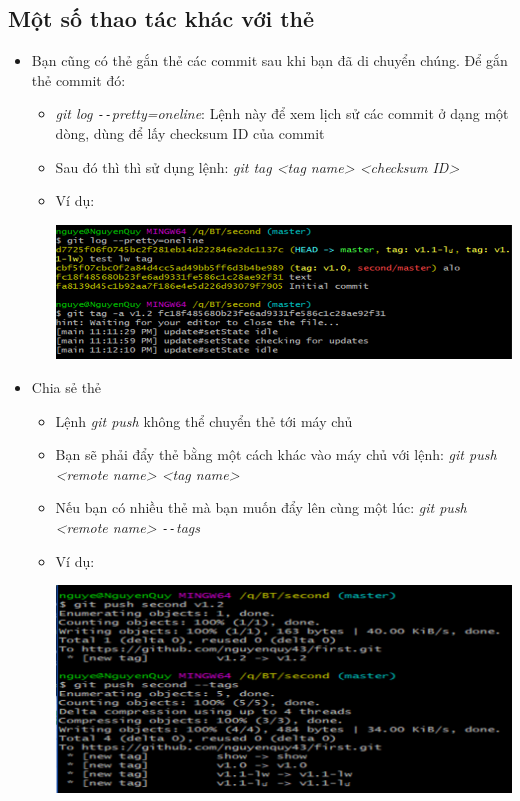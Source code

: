 \documentclass[12pt,a4paper]{report}
\begin{document}
\subsection{Một số thao tác khác với thẻ}
\begin{itemize}
\item Bạn cũng có thẻ gắn thẻ các commit sau khi bạn đã di chuyển chúng. Để gắn thẻ commit đó:
\begin{itemize}
\item {\it git log \texttt{-{}-}pretty=oneline}: Lệnh này để xem lịch sử các commit ở dạng một dòng, dùng để lấy checksum ID của commit
\item Sau đó thì thì sử dụng lệnh: {\it git tag <tag name> <checksum ID>}
\item Ví dụ: 

	\includegraphics[width=0.8\linewidth]{screenshot044}

	\label{fig:screenshot044}
\end{itemize}
\item Chia sẻ thẻ
\begin{itemize}
\item Lệnh \textit{git push} không thể chuyển thẻ tới máy chủ
\item Bạn sẽ phải đẩy thẻ bằng một cách khác vào máy chủ với lệnh: {\it git push <remote name> <tag name>}
\item Nếu bạn có nhiều thẻ mà bạn muốn đẩy lên cùng một lúc: {\it git push <remote name> \texttt{-{}-}tags}
\item Ví dụ:

	\includegraphics[width=0.8\linewidth]{screenshot045}

	\label{fig:screenshot045}
\end{itemize}


\end{itemize}
\end{document}

